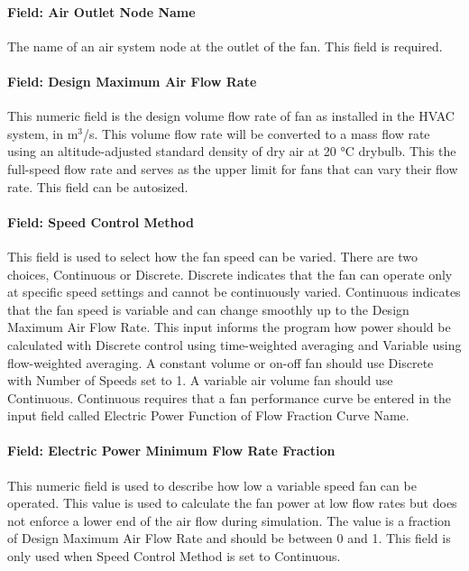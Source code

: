 \paragraph{Field: Air Outlet Node Name}\label{field-air-outlet-node-name-fansysmodel}

The name of an air system node at the outlet of the fan. This field is required.

\paragraph{Field: Design Maximum Air Flow Rate}\label{field-design-air-flow-fansysmodel}

This numeric field is the design volume flow rate of fan as installed in the HVAC system, in m\(^{3}\)/s. This volume flow rate will be converted to a mass flow rate using an altitude-adjusted standard density of dry air at 20 °C drybulb. This the full-speed flow rate and serves as the upper limit for fans that can vary their flow rate. This field can be autosized.

\paragraph{Field: Speed Control Method}\label{field-speed-method-fansysmodel}

This field is used to select how the fan speed can be varied. There are two choices, Continuous or Discrete.  Discrete indicates that the fan can operate only at specific speed settings and cannot be continuously varied.  Continuous indicates that the fan speed is variable and can change smoothly up to the Design Maximum Air Flow Rate. This input informs the program how power should be calculated with Discrete control using time-weighted averaging and Variable using flow-weighted averaging. A constant volume or on-off fan should use Discrete with Number of Speeds set to 1.  A variable air volume fan should use Continuous. Continuous requires that a fan performance curve be entered in the input field called Electric Power Function of Flow Fraction Curve Name.

\paragraph{Field: Electric Power Minimum Flow Rate Fraction}\label{field-power-min-flow-fraction-fansysmodel}

This numeric field is used to describe how low a variable speed fan can be operated. This value is used to calculate the fan power at low flow rates but does not enforce a lower end of the air flow during simulation. The value is a fraction of Design Maximum Air Flow Rate and should be between 0 and 1. This field is only used when Speed Control Method is set to Continuous.

